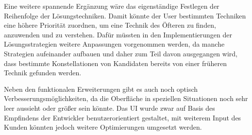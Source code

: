 Eine weitere spannende Ergänzung wäre das eigenständige Festlegen der Reihenfolge der Lösungstechniken. Damit könnte der User bestimmten Techniken eine höhere Priorität zuordnen, um eine Technik des Öfteren zu finden, anzuwenden und zu verstehen. Dafür müssten in den Implementierungen der Lösungsstrategien weitere Anpassungen vorgenommen werden, da manche Strategien aufeinander aufbauen und daher zum Teil davon ausgegangen wird, dass bestimmte Konstellationen von Kandidaten bereits von einer früheren Technik gefunden werden.

Neben den funktionalen Erweiterungen gibt es auch noch optisch Verbesserungsmöglichkeiten, da die Oberfläche in speziellen Situationen noch sehr leer aussieht oder größer sein könnte. Das \ac{UI} wurde zwar auf Basis des Empfindens der Entwickler benutzerorientiert gestaltet, mit weiterem Input des Kunden könnten jedoch weitere Optimierungen umgesetzt werden. 

